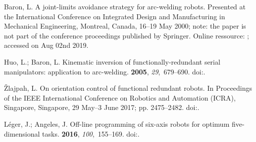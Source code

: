 \documentclass[robotics,article,accept,moreauthors,pdftex]{Definitions/mdpi}
\begin{document}


\begin{thebibliography}{999}
{Baron, L.
\newblock A joint-limits avoidance strategy for arc-welding robots.
\newblock  Presented at the International Conference on Integrated Design and Manufacturing in Mechanical Engineering, Montreal, Canada, 16--19 May  2000; note: the paper is not part of the conference proceedings published by Springer. Online ressource: {\href{https://www.researchgate.net/profile/Luc_Baron}{}}; accessed on Aug 02nd 2019.}

Huo, L.; Baron, L.
\newblock Kinematic inversion of functionally-redundant serial manipulators:
  application to arc-welding.
  {\bf 2005}, {\em 29},~679--690.
\newblock
  doi:{\href{https://doi.org/10.1139/tcsme-2005-0045}{}}.

Žlajpah, L.
\newblock On orientation control of functional redundant robots.
\newblock  In Proceedings of the IEEE International Conference on Robotics and Automation (ICRA), Singapore, Singapore, 29 May--3 June 2017; pp. 2475--2482.
\newblock
  doi:{\href{https://doi.org/10.1109/ICRA.2017.7989288}{}}.

Léger, J.; Angeles, J.
\newblock Off-line programming of six-axis robots for optimum five-dimensional
  tasks.
 {\bf 2016}, {\em 100},~155--169.
\newblock
  doi:{\href{https://doi.org/10.1016/j.mechmachtheory.2016.01.015}{}}.


\end{thebibliography}
\end{document}
